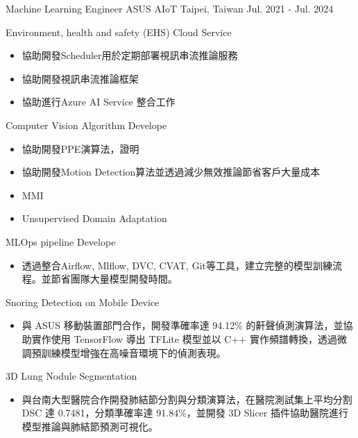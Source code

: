 

\begin{cventries}


  \cventry
    {Machine Learning Engineer} %
    {ASUS AIoT} %
    {Taipei, Taiwan} %
    {Jul. 2021 - Jul. 2024} %
    {
      \begin{cvitems} %
        \item {Environment, health and safety (EHS) Cloud Service}
        \begin{itemize}
            \item 協助開發Scheduler用於定期部署視訊串流推論服務
            \item 協助開發視訊串流推論框架
            \item 協助進行Azure AI Service 整合工作
        \end{itemize}
        \item {Computer Vision Algorithm Develope}
        \begin{itemize}
            \item 協助開發PPE演算法，證明
            \item 協助開發Motion Detection算法並透過減少無效推論節省客戶大量成本
            \item MMI
            \item Unsupervised Domain Adaptation
        \end{itemize}
        \item {MLOps pipeline Develope}
        \begin{itemize}
            \item 透過整合Airflow, Mlflow, DVC, CVAT, Git等工具，建立完整的模型訓練流程。並節省團隊大量模型開發時間。
        \end{itemize}
        \item Snoring Detection on Mobile Device
        \begin{itemize}
            \item 與 ASUS 移動裝置部門合作，開發準確率達 94.12\% 的鼾聲偵測演算法，並協助實作使用 TensorFlow 導出 TFLite 模型並以 C++ 實作頻譜轉換，透過微調預訓練模型增強在高噪音環境下的偵測表現。
        \end{itemize}
        \item 3D Lung Nodule Segmentation
        \begin{itemize}
            \item 與台南大型醫院合作開發肺結節分割與分類演算法，在醫院測試集上平均分割 DSC 達 0.7481，分類準確率達 91.84\%，並開發 3D Slicer 插件協助醫院進行模型推論與肺結節預測可視化。
        \end{itemize}
      \end{cvitems}
    }


\end{cventries}
